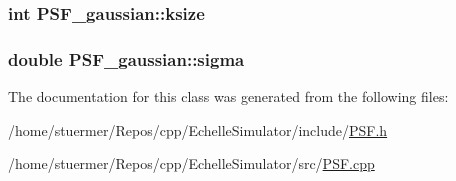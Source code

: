 \subsubsection[{\texorpdfstring{ksize}{ksize}}]{\setlength{\rightskip}{0pt plus 5cm}int P\+S\+F\+\_\+gaussian\+::ksize\hspace{0.3cm}{\ttfamily [private]}}\hypertarget{class_p_s_f__gaussian_a553862ec78e59f6f36a67f9ddd50048c}{}\label{class_p_s_f__gaussian_a553862ec78e59f6f36a67f9ddd50048c}
\subsubsection[{\texorpdfstring{sigma}{sigma}}]{\setlength{\rightskip}{0pt plus 5cm}double P\+S\+F\+\_\+gaussian\+::sigma\hspace{0.3cm}{\ttfamily [private]}}\hypertarget{class_p_s_f__gaussian_ad0bcbd4165e73b7645f18906dd0d4aef}{}\label{class_p_s_f__gaussian_ad0bcbd4165e73b7645f18906dd0d4aef}


The documentation for this class was generated from the following files\+:\begin{DoxyCompactItemize}
\item 
/home/stuermer/\+Repos/cpp/\+Echelle\+Simulator/include/\hyperlink{_p_s_f_8h}{P\+S\+F.\+h}\item 
/home/stuermer/\+Repos/cpp/\+Echelle\+Simulator/src/\hyperlink{_p_s_f_8cpp}{P\+S\+F.\+cpp}\end{DoxyCompactItemize}
